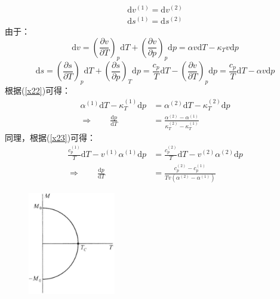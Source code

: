 \documentclass[12pt]{article}
\begin{document}
\begin{equation}
	\begin{split}
		\mathrm{d}v^{(1)}=\mathrm{d}v^{(2)}\\
		\mathrm{d}s^{(1)}=\mathrm{d}s^{(2)}
	\end{split}
\end{equation}
由于：
\begin{equation}
		\mathrm{d}v=(\frac{\partial v}{\partial T})_p\mathrm{d}T+(\frac{\partial v}{\partial p})_p\mathrm{d}p=\alpha v\mathrm{d}T-\kappa_T v\mathrm{d}p
		\label{x22}
	\end{equation}
\begin{equation}
		\mathrm{d}s=(\frac{\partial s}{\partial T})_p\mathrm{d}T+(\frac{\partial s}{\partial p})_T\mathrm{d}p=\frac{c_p}{T}\mathrm{d}T-(\frac{\partial v}{\partial T})_p\mathrm{d}p=\frac{c_p}{T}\mathrm{d}T-\alpha v\mathrm{d}p
		\label{x23}
\end{equation}
根据(\ref{x22})可得：
\begin{equation}
	\begin{split}
		\alpha^{(1)}\mathrm{d}T-\kappa_T^{(1)}\mathrm{d}p&=\alpha^{(2)}\mathrm{d}T-\kappa_T^{(2)}\mathrm{d}p
		\\
		\Rightarrow \quad\quad \frac{\mathrm{d}p}{\mathrm{d}T}&=\frac{\alpha^{(2)}-\alpha^{(1)}}{\kappa_T^{(2)}-\kappa_T^{(1)}}
	\end{split}
\end{equation}
同理，根据(\ref{x23})可得：
\begin{equation}
	\begin{split}
		\frac{c_p^{(1)}}{T}\mathrm{d}T-v^{(1)}\alpha^{(1)}\mathrm{d}p&=\frac{c_p^{(2)}}{T}\mathrm{d}T-v^{(2)}\alpha^{(2)}\mathrm{d}p\\
		\Rightarrow\quad\quad
		\frac{\mathrm{d}p}{\mathrm{d}T}&=\frac{c_p^{(2)}-c_p^{(1)}}{Tv(\alpha^{(2)}-\alpha^{(1)})}
	\end{split}
\end{equation}
\begin{figure}
	\begin{center}
		\includegraphics[width=1.5in]{F12.png}
		\label{F12}
	\end{center}
\end{figure}
\end{document}
